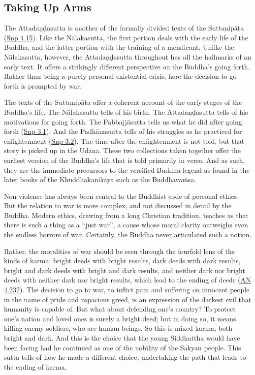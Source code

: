 \documentclass[12pt,openany]{book}%
\begin{document}
\subsection*{Taking Up Arms}

The \textsanskrit{Attadaṇḍasutta} is another of the formally divided texts of the \textsanskrit{Suttanipāta} (\href{https://suttacentral.net/snp4.15/en/sujato}{Snp 4.15}). Like the \textsanskrit{Nālakasutta}, the first portion deals with the early life of the Buddha, and the latter portion with the training of a mendicant. Unlike the \textsanskrit{Nālakasutta}, however, the \textsanskrit{Attadaṇḍasutta} throughout has all the hallmarks of an early text. It offers a strikingly different perspective on the Buddha’s going forth. Rather than being a purely personal existential crisis, here the decision to go forth is prompted by war.

The texts of the \textsanskrit{Suttanipāta} offer a coherent account of the early stages of the Buddha’s life. The \textsanskrit{Nālakasutta} tells of his birth. The \textsanskrit{Attadaṇḍasutta} tells of his motivations for going forth. The \textsanskrit{Pabbajjāsutta} tells us what he did after going forth (\href{https://suttacentral.net/snp3.1/en/sujato}{Snp 3.1}). And the \textsanskrit{Padhānasutta} tells of his struggles as he practiced for enlightenment (\href{https://suttacentral.net/snp3.2/en/sujato}{Snp 3.2}). The time after the enlightenment is not told, but that story is picked up in the \textsanskrit{Udāna}. These two collections taken together offer the earliest version of the Buddha’s life that is told primarily in verse. And as such, they are the immediate precursors to the versified Buddha legend as found in the later books of the \textsanskrit{Khuddhakanikāya} such as the \textsanskrit{Buddhavaṁsa}.

Non-violence has always been central to the Buddhist code of personal ethics. But the relation to war is more complex, and not discussed in detail by the Buddha. Modern ethics, drawing from a long Christian tradition, teaches us that there is such a thing as a “just war”, a cause whose moral clarity outweighs even the endless horrors of war. Certainly, the Buddha never articulated such a notion.

Rather, the moralities of war should be seen through the fourfold lens of the kinds of karma: bright deeds with bright results, dark deeds with dark results, bright and dark deeds with bright and dark results, and neither dark nor bright deeds with neither dark nor bright results, which lead to the ending of deeds (\href{https://suttacentral.net/an4.232/en/sujato}{AN 4.232}). The decision to go to war, to inflict pain and suffering on innocent people in the name of pride and rapacious greed, is an expression of the darkest evil that humanity is capable of. But what about defending one’s country? To protect one’s nation and loved ones is surely a bright deed; but in doing so, it means killing enemy soldiers, who are human beings. So this is mixed karma, both bright and dark. And this is the choice that the young Siddhattha would have been facing had he continued as one of the nobility of the Sakyan people. This sutta tells of how he made a different choice, undertaking the path that leads to the ending of karma.
\end{document}

